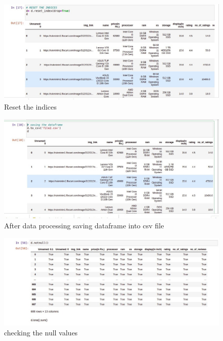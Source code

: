 \begin{figure}[h]
\centering
\footnotesize
\includegraphics[width=7in]{29.jpeg}
\caption{Reset the indices}
\label{fig:unevenlight}
\end{figure}
\vspace{5\baselineskip}
\begin{figure}[h]
\centering
\footnotesize
\includegraphics[width=6in]{30.jpeg}
\caption{After data processing saving dataframe into csv file }
\label{fig:unevenlight}
\end{figure}
\vspace{7\baselineskip}

\begin{figure}[h]
\centering
\footnotesize
\includegraphics[width=7in]{24.jpeg}
\caption{checking the null values}
\label{fig:unevenlight}
\end{figure}

